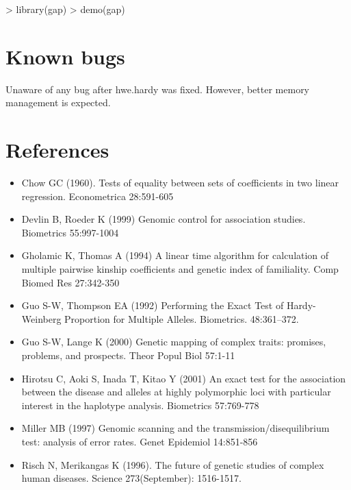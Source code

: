 \documentclass[10pt,a4paper]{article}
\begin{document}
\begin{Schunk}
\begin{Sinput}
> library(gap)
> demo(gap)
\end{Sinput}
\end{Schunk}

\section{Known bugs}

Unaware of any bug after hwe.hardy was fixed. However, better memory management is expected.


\section{References}
\begin{itemize}
\item[] 
Chow GC (1960). Tests of equality between sets of coefficients in two
linear regression. Econometrica 28:591-605

\item[] 
Devlin B, Roeder K (1999) Genomic control for association studies. 
Biometrics 55:997-1004

\item[] 
Gholamic K, Thomas A (1994) A linear time algorithm for calculation of
multiple pairwise kinship coefficients and genetic index of familiality.
Comp Biomed Res 27:342-350

\item[] 
Guo S-W, Thompson EA (1992) Performing the Exact Test of
Hardy-Weinberg Proportion for Multiple Alleles. Biometrics. 48:361--372.

\item[] 
Guo S-W, Lange K (2000) Genetic mapping of complex traits: promises, problems, 
and prospects. Theor Popul Biol 57:1-11

\item[] 
Hirotsu C, Aoki S, Inada T, Kitao Y (2001) An exact test for the association
between the disease and alleles at highly polymorphic loci with particular interest
in the haplotype analysis. Biometrics 57:769-778

\item[] 
Miller MB (1997) Genomic scanning and the transmission/disequilibrium test:
analysis of error rates. Genet Epidemiol 14:851-856

\item[] 
Risch N, Merikangas K (1996). The future of genetic studies of
complex human diseases. Science 273(September): 1516-1517.
 

\end{itemize}
\end{document}
